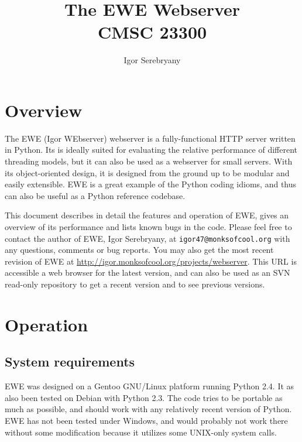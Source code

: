 \documentclass{article}
\begin{document}
\author{Igor Serebryany}
\title{The EWE Webserver \\ CMSC 23300}
\maketitle
\clearpage

\section{Overview}

The EWE (Igor WEbserver) webserver is a fully-functional HTTP server written in Python.
Its is ideally suited for evaluating the relative performance of different threading models, but it can also be used as a webserver for small servers.
With its object-oriented design, it is designed from the ground up to be modular and easily extensible.
EWE is a great example of the Python coding idioms, and thus can also be useful as a Python reference codebase.

This document describes in detail the features and operation of EWE, gives an overview of its performance and lists known bugs in the code.
Please feel free to contact the author of EWE, Igor Serebryany, at \texttt{igor47@monksofcool.org} with any questions, comments or bug reports.
You may also get the most recent revision of EWE at \url{http://igor.monksofcool.org/projects/webserver}.
This URL is accessible a web browser for the latest version, and can also be used as an SVN read-only repository to get a recent version and to see previous versions.

\section{Operation}
\subsection{System requirements}
EWE was designed on a Gentoo GNU/Linux platform running Python 2.4.
It as also been tested on Debian with Python 2.3.
The code tries to be portable as much as possible, and should work with any relatively recent version of Python.
EWE has not been tested under Windows, and would probably not work there without some modification because it utilizes some UNIX-only system calls.
\end{document}
